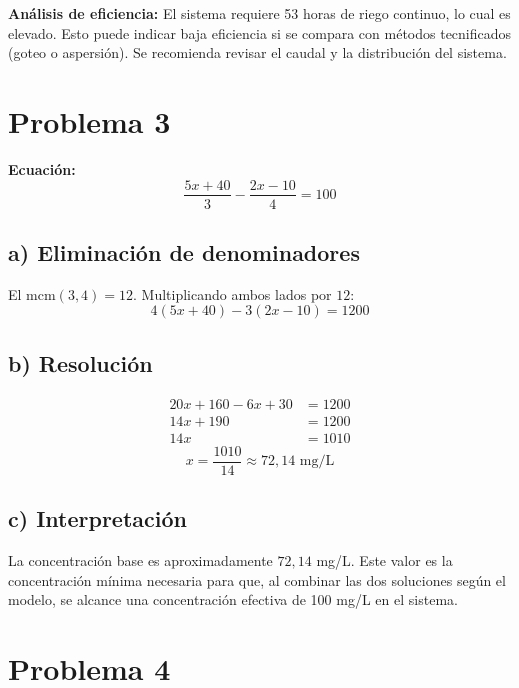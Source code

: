 \documentclass[12pt]{article}
\begin{document}
	\textbf{Análisis de eficiencia:} El sistema requiere 53 horas de riego continuo,
	lo cual es elevado. Esto puede indicar baja eficiencia si se compara con métodos
	tecnificados (goteo o aspersión). Se recomienda revisar el caudal y la
	distribución del sistema.
	
	\bigskip
	
	\section*{Problema 3}
	
	\textbf{Ecuación:}
	\[
	\frac{5x + 40}{3} - \frac{2x - 10}{4} = 100
	\]
	
	\subsection*{a) Eliminación de denominadores}
	
	El $\text{mcm}(3,4) = 12$. Multiplicando ambos lados por $12$:
	\[
	4(5x + 40) - 3(2x - 10) = 1200
	\]
	
	\subsection*{b) Resolución}
	
	\begin{align*}
		20x + 160 - 6x + 30 &= 1200 \\
		14x + 190           &= 1200 \\
		14x                 &= 1010
	\end{align*}
	\[
	\boxed{x = \frac{1010}{14} \approx 72{,}14 \text{ mg/L}}
	\]
	
	\subsection*{c) Interpretación}
	
	La concentración base es aproximadamente $72{,}14$ mg/L. Este valor es la
	concentración mínima necesaria para que, al combinar las dos soluciones según
	el modelo, se alcance una concentración efectiva de 100 mg/L en el sistema.
	
	\bigskip
	
	\section*{Problema 4}
	
\end{document}
